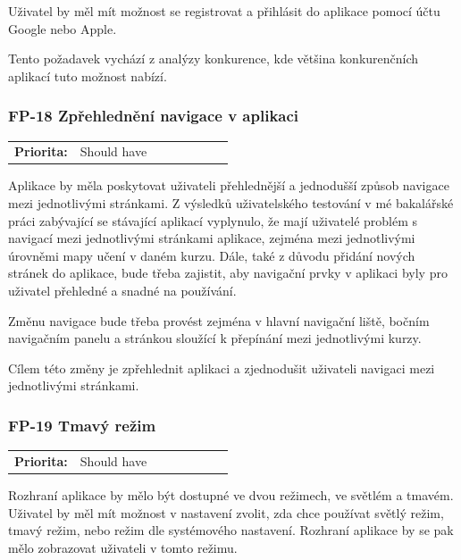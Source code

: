 Uživatel by měl mít možnost se registrovat a přihlásit do aplikace pomocí účtu Google nebo Apple. 

Tento požadavek vychází z analýzy konkurence, kde většina konkurenčních aplikací tuto možnost nabízí.

\subsubsection{FP-18 Zpřehlednění navigace v aplikaci}

\begin{tabular}{lp{0.7\linewidth}}
    \textbf{Priorita:} & Should have \\
\end{tabular}

Aplikace by měla poskytovat uživateli přehlednější a jednodušší způsob navigace mezi jednotlivými stránkami. Z výsledků uživatelského testování v mé bakalářské práci \cite{Jenicek2024BachelorThesis} zabývající se stávající aplikací vyplynulo, že mají uživatelé problém s navigací mezi jednotlivými stránkami aplikace, zejména mezi jednotlivými úrovněmi mapy učení v daném kurzu. Dále, také z důvodu přidání nových stránek do aplikace, bude třeba zajistit, aby navigační prvky v aplikaci byly pro uživatel přehledné a snadné na používání.

Změnu navigace bude třeba provést zejména v hlavní navigační liště, bočním navigačním panelu a stránkou sloužící k přepínání mezi jednotlivými kurzy.

Cílem této změny je zpřehlednit aplikaci a zjednodušit uživateli navigaci mezi jednotlivými stránkami.

\subsubsection{FP-19 Tmavý režim}

\begin{tabular}{lp{0.7\linewidth}}
    \textbf{Priorita:} & Should have \\
\end{tabular}

Rozhraní aplikace by mělo být dostupné ve dvou režimech, ve světlém a tmavém. Uživatel by měl mít možnost v nastavení zvolit, zda chce používat světlý režim, tmavý režim, nebo režim dle systémového nastavení. Rozhraní aplikace by se pak mělo zobrazovat uživateli v tomto režimu.

